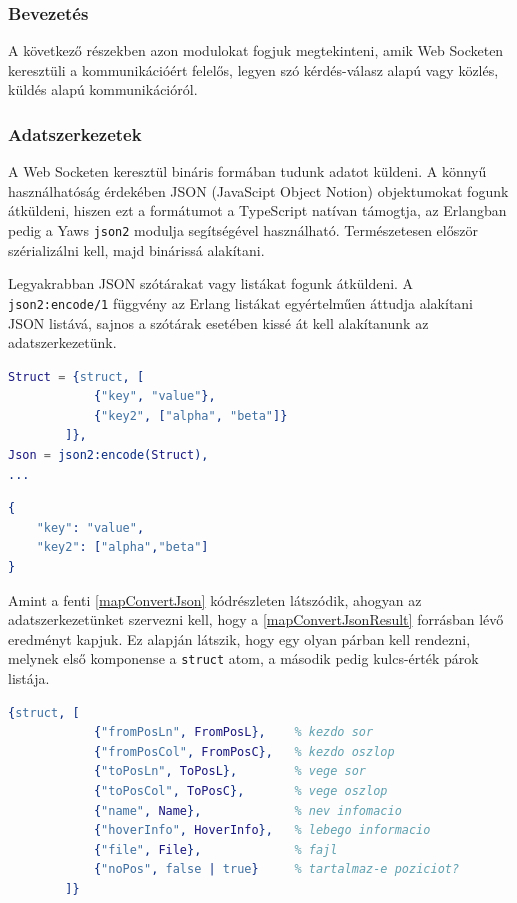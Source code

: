 \subsubsection{Bevezetés}
A következő részekben azon modulokat fogjuk megtekinteni, amik Web Socketen keresztüli a kommunikációért felelős, legyen szó kérdés-válasz alapú vagy közlés, küldés alapú kommunikációról.

\subsubsection{Adatszerkezetek}
A Web Socketen keresztül bináris formában tudunk adatot küldeni. A könnyű használhatóság érdekében JSON (JavaScipt Object Notion) objektumokat fogunk átküldeni, hiszen ezt a formátumot a TypeScript natívan támogtja, az Erlangban pedig a Yaws \lstinline{json2} modulja segítségével használható. Természetesen először szérializálni kell, majd binárissá alakítani.

Legyakrabban JSON szótárakat vagy listákat fogunk átküldeni. A \lstinline{json2:encode/1} függvény az Erlang listákat egyértelműen áttudja alakítani JSON listává, sajnos a szótárak esetében kissé át kell alakítanunk az adatszerkezetünk.

\lstset{caption=Példa szótárak átalakítása, label=mapConvertJson}
\begin{lstlisting}[language={erlang}] 
Struct = {struct, [
            {"key", "value"}, 
            {"key2", ["alpha", "beta"]}
        ]},
Json = json2:encode(Struct),
...
\end{lstlisting}

\lstset{caption=Átalakított példa szótár, label=mapConvertJsonResult} 
\begin{lstlisting}[language={erlang}] 
{
    "key": "value",
    "key2": ["alpha","beta"]
}
\end{lstlisting}

Amint a fenti \ref{mapConvertJson} kódrészleten látszódik, ahogyan az adatszerkezetünket szervezni kell, hogy a \ref{mapConvertJsonResult} forrásban lévő eredményt kapjuk. Ez alapján látszik, hogy egy olyan párban kell rendezni, melynek első komponense a \lstinline{struct} atom, a második pedig kulcs-érték párok listája.


\lstset{caption=Egy lekérdezés egyetlen elemének reprezentációja, label=structQueryRes}
\begin{lstlisting}[language={erlang}]
{struct, [
            {"fromPosLn", FromPosL},    % kezdo sor
            {"fromPosCol", FromPosC},   % kezdo oszlop
            {"toPosLn", ToPosL},        % vege sor
            {"toPosCol", ToPosC},       % vege oszlop
            {"name", Name},             % nev infomacio
            {"hoverInfo", HoverInfo},   % lebego informacio
            {"file", File},             % fajl
            {"noPos", false | true}     % tartalmaz-e poziciot?
        ]}
\end{lstlisting}

